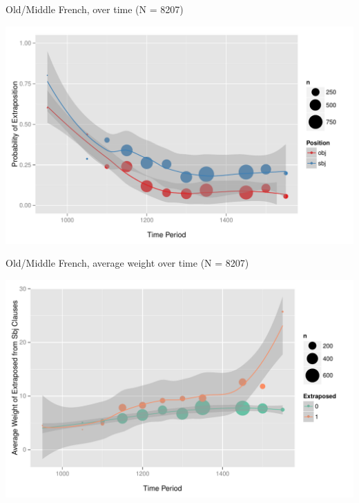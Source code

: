 \documentclass[hyperref={pdfpagelabels=false}]{beamer}
\begin{document}
\begin{frame}{Old/Middle French, over time (N = 8207)}

\begin{center}
\includegraphics[width=1.1\textwidth]{exSbjObjYearBinned50Loessfre.pdf}
\end{center}
\end{frame}


\begin{frame}{Old/Middle French, average weight over time (N = 8207)}

\begin{center}
\includegraphics[width=1.1\textwidth]{exWeightYearBinned50Loessfre.pdf}
\end{center}
\end{frame}
\end{document}
